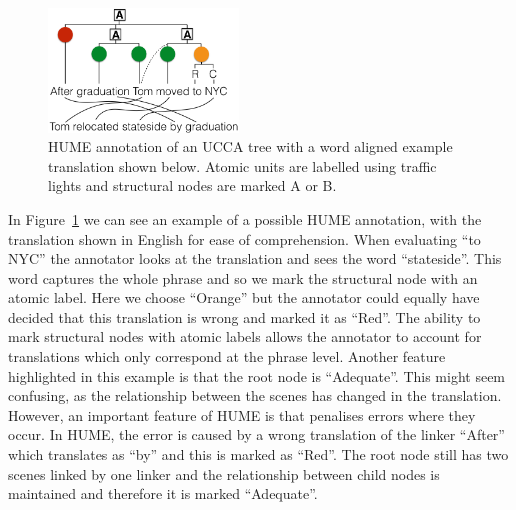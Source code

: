 \documentclass[11pt]{article}
\begin{document}
\begin{figure}
    \begin{center}
    \includegraphics[width=0.45\textwidth]{ucca-tree-mteval-v2.png}
    \end{center}
  \caption{\label{fig:hume_tree_v2}
     HUME annotation of an UCCA tree with a word aligned example translation shown below. 
Atomic units are labelled using traffic lights and structural nodes are marked A or B.}
\end{figure}

In Figure~\ref{fig:hume_tree_v2} we can see an example of a possible HUME
annotation, with the translation shown in English for ease of comprehension.
When evaluating ``to NYC'' the annotator looks at the translation and sees the
word ``stateside''. This word captures the whole phrase and so we mark the
structural node with an atomic label. Here we choose ``Orange'' but the
annotator could equally have decided that this translation is wrong and marked
it as ``Red''. The ability to mark structural nodes with atomic labels allows
the annotator to account for translations which only correspond at the phrase
level. Another feature highlighted in this example is that the root node is
``Adequate''. This might seem confusing, as the relationship between the scenes
has changed in the translation. However, an important feature of HUME is that
penalises errors where they occur. In HUME, the error is caused by a wrong
translation of the linker ``After'' which translates as ``by'' and this is
marked as ``Red''. The root node still has two scenes linked by one linker and
the relationship between child nodes is maintained and therefore it is marked
``Adequate''.
\end{document}
